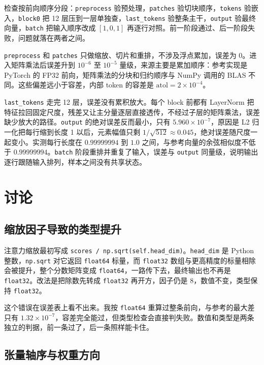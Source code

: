 \documentclass[a4paper,12pt]{article}
\begin{document}
检查按前向顺序分段：\texttt{preprocess} 验预处理，\texttt{patches} 验切块顺序，\texttt{tokens} 验嵌入，\texttt{block0} 把 12 层压到一层单独查，\texttt{last\_tokens} 验整条主干，\texttt{output} 验最终向量，\texttt{batch} 把输入顺序改成 $[1,0,1]$ 再逐行对照。前一阶段通过、后一阶段失败，问题就落在两者之间。

\texttt{preprocess} 和 \texttt{patches} 只做缩放、切片和重排，不涉及浮点累加，误差为 0。进入矩阵乘法后误差升到 $10^{-6}$ 至 $10^{-5}$ 量级，来源主要是累加顺序：参考实现是 PyTorch 的 FP32 前向，矩阵乘法的分块和归约顺序与 NumPy 调用的 BLAS 不同。这些偏差远小于容差，内部 token 的容差是 $\mathrm{atol}=2\times10^{-4}$。

\texttt{last\_tokens} 走完 12 层，误差没有累积放大。每个 block 前都有 LayerNorm 把特征拉回固定尺度，残差又让主分量逐层直接透传，不经过子层的矩阵乘法，误差缺少放大的路径。\texttt{output} 的绝对误差反而最小，只有 $5.960\times10^{-7}$，原因是 L2 归一化把每行缩到长度 1 以后，元素幅值只剩 $1/\sqrt{512}\approx0.045$，绝对误差随尺度一起变小。实测每行长度在 $0.99999994$ 到 $1.0$ 之间，与参考向量的余弦相似度不低于 $0.99999994$。\texttt{batch} 阶段重排并重复了输入，误差与 \texttt{output} 同量级，说明输出逐行跟随输入排列，样本之间没有共享状态。

\section{讨论}

\subsection{缩放因子导致的类型提升}

注意力缩放最初写成 \verb|scores / np.sqrt(self.head_dim)|。\texttt{head\_dim} 是 Python 整数，\verb|np.sqrt| 对它返回 \texttt{float64} 标量，而 \texttt{float32} 数组与更高精度的标量相除会被提升，整个分数矩阵变成 \texttt{float64}，一路传下去，最终输出也不再是 \texttt{float32}。改法是把除数先转成 \texttt{float32} 再开方，因子仍是 8，数值不变，类型保持 \texttt{float32}。

这个错误在误差表上看不出来。我按 \texttt{float64} 重算过整条前向，与参考的最大差只有 $1.32\times10^{-7}$，容差完全能过，但类型检查会直接判失败。数值和类型是两条独立的判据，前一条过了，后一条照样能卡住。

\subsection{张量轴序与权重方向}
\end{document}
